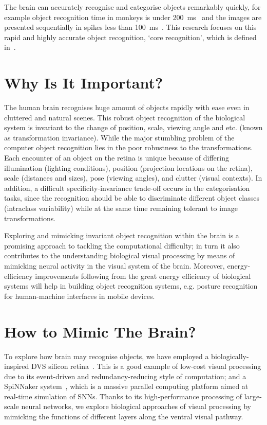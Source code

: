 The brain can accurately recognise and categorise objects remarkably quickly, for example object recognition time in monkeys is under 200~ms~\cite{fabre1998rapid} and the images are presented sequentially in spikes less than 100~ms~\cite{keysers2001speed}.
This research focuses on this rapid and highly accurate object recognition, `core recognition', which is defined in~\cite{dicarlo2007untangling}.


\section{Why Is It Important?}
\label{sec:imp}
The human brain recognises huge amount of objects rapidly with ease even in cluttered and natural scenes.
This robust object recognition of the biological system is invariant to the change of position, scale, viewing angle and etc. (known as transformation invariance).
While the major stumbling problem of the computer object recognition lies in the poor robustness to the transformations.
Each encounter of an object on the retina is unique because of differing illumination (lighting conditions), position (projection locations on the retina), scale (distances and sizes), pose (viewing angles), and clutter (visual contexts).
In addition, a difficult specificity-invariance trade-off occurs in the categorisation tasks, since the recognition should be able to discriminate different object classes (intraclass variability) while at the same time remaining tolerant to image transformations.   

Exploring and mimicking invariant object recognition within the brain is a promising approach to tackling the computational difficulty;
in turn it also contributes to the understanding biological visual processing by means of mimicking neural activity in the visual system of the brain.
Moreover, energy-efficiency improvements following from the great energy efficiency of biological systems will help in building object recognition systems, e.g. posture recognition for human-machine interfaces in mobile devices.  

\section{How to Mimic The Brain?}
\label{sec:brn}
To explore how brain may recognise objects, we have employed a biologically-inspired DVS silicon retina~\cite{lenero20113}.
This is a good example of low-cost visual processing due to its event-driven and redundancy-reducing style of computation;
and a SpiNNaker system~\cite{furber2014spinnaker}, which is a massive parallel computing platform aimed at real-time simulation of SNNs. 
Thanks to its high-performance processing of large-scale neural networks, we explore biological approaches of visual processing by mimicking the functions of different layers along the ventral visual pathway. 

